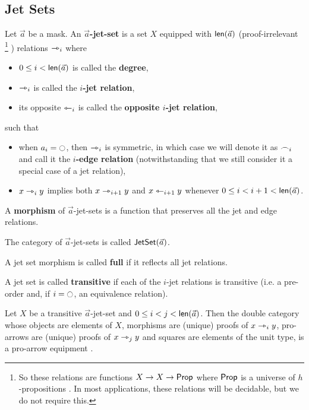 \documentclass[a4paper]{article}
\begin{document}
\subsection{Jet Sets}
\begin{definition} \label{def:jetset}
	Let $\vec a$ be a mask. An \textbf{$\vec a$-jet-set} is a set $X$ equipped with $\mathsf{len}(\vec a)$ (proof-irrelevant%
	\footnote{So these relations are functions $X \to X \to {\mathsf{Prop}}$ where ${\mathsf{Prop}}$ is a universe of $h$-propositions \cite{hottbook}. In most applications, these relations will be decidable, but we do not require this.}%
	) relations $\rightarrowtriangle_i$ where
	\begin{itemize}
		\item $0 \leq i < \mathsf{len}(\vec a)$ is called the \textbf{degree},
		\item $\rightarrowtriangle_i$ is called the \textbf{$i$-jet relation},
		\item its opposite $\leftarrowtriangle_i$ is called the \textbf{opposite $i$-jet relation},
	\end{itemize}
	such that
	\begin{itemize}
		\item when $a_i = \npolar$, then $\rightarrowtriangle_i$ is symmetric, in which case we will denote it as $\frown_i$ and call it the \textbf{$i$-edge relation} (notwithstanding that we still consider it a special case of a jet relation),
		\item $x \rightarrowtriangle_i y$ implies both $x \rightarrowtriangle_{i+1} y$ and $x \leftarrowtriangle_{i+1} y$ whenever $0 \leq i < i+1 < \mathsf{len}(\vec a)$.
	\end{itemize}
	A \textbf{morphism} of $\vec a$-jet-sets is a function that preserves all the jet and edge relations.
	
	The category of $\vec a$-jet-sets is called $\mathsf{JetSet}(\vec a)$.
\end{definition}
\begin{definition} \label{def:full-jetsethom}
	A jet set morphism is called \textbf{full} if it reflects all jet relations.
\end{definition}
\begin{definition} \label{def:transitive-jetset}
	A jet set is called \textbf{transitive} if each of the $i$-jet relations is transitive (i.e. a pre-order and, if $i = \npolar$, an equivalence relation).
\end{definition}
\begin{proposition} \label{thm:jetset-equipment}
	Let $X$ be a transitive $\vec a$-jet-set and $0 \leq i < j < \mathsf{len}(\vec a)$.
	Then the double category whose objects are elements of $X$, morphisms are (unique) proofs of $x \rightarrowtriangle_i y$, pro-arrows are (unique) proofs of $x \rightarrowtriangle_{j} y$ and squares are elements of the unit type, is a pro-arrow equipment \cite{nlab:proarrow,proarrow1,proarrow2}.
\end{proposition}
\end{document}
